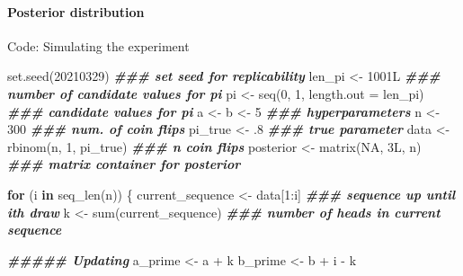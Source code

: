 \documentclass[
  11pt,
]{article}
\newenvironment{Shaded}{\begin{snugshade}}{\end{snugshade}}
\newcommand{\AttributeTok}[1]{\textcolor[rgb]{0.77,0.63,0.00}{#1}}
\newcommand{\ConstantTok}[1]{\textcolor[rgb]{0.00,0.00,0.00}{#1}}
\newcommand{\ControlFlowTok}[1]{\textcolor[rgb]{0.13,0.29,0.53}{\textbf{#1}}}
\newcommand{\DecValTok}[1]{\textcolor[rgb]{0.00,0.00,0.81}{#1}}
\newcommand{\DocumentationTok}[1]{\textcolor[rgb]{0.56,0.35,0.01}{\textbf{\textit{#1}}}}
\newcommand{\FunctionTok}[1]{\textcolor[rgb]{0.00,0.00,0.00}{#1}}
\newcommand{\NormalTok}[1]{#1}
\newcommand{\OtherTok}[1]{\textcolor[rgb]{0.56,0.35,0.01}{#1}}
\newcommand{\SpecialCharTok}[1]{\textcolor[rgb]{0.00,0.00,0.00}{#1}}
\begin{document}
\hypertarget{posterior-distribution-1}{%
\paragraph{Posterior distribution}\label{posterior-distribution-1}}

Code: Simulating the experiment

\begin{Shaded}
\begin{Highlighting}[]
\FunctionTok{set.seed}\NormalTok{(}\DecValTok{20210329}\NormalTok{)                   }\DocumentationTok{\#\#\# set seed for replicability}
\NormalTok{len\_pi }\OtherTok{\textless{}{-}}\NormalTok{ 1001L                      }\DocumentationTok{\#\#\# number of candidate values for pi}
\NormalTok{pi }\OtherTok{\textless{}{-}} \FunctionTok{seq}\NormalTok{(}\DecValTok{0}\NormalTok{, }\DecValTok{1}\NormalTok{, }\AttributeTok{length.out =}\NormalTok{ len\_pi) }\DocumentationTok{\#\#\# candidate values for pi}
\NormalTok{a }\OtherTok{\textless{}{-}}\NormalTok{ b }\OtherTok{\textless{}{-}} \DecValTok{5}                          \DocumentationTok{\#\#\# hyperparameters}
\NormalTok{n }\OtherTok{\textless{}{-}} \DecValTok{300}                             \DocumentationTok{\#\#\# num. of coin flips}
\NormalTok{pi\_true }\OtherTok{\textless{}{-}}\NormalTok{ .}\DecValTok{8}                        \DocumentationTok{\#\#\# true parameter}
\NormalTok{data }\OtherTok{\textless{}{-}} \FunctionTok{rbinom}\NormalTok{(n, }\DecValTok{1}\NormalTok{, pi\_true)        }\DocumentationTok{\#\#\# n coin flips}
\NormalTok{posterior }\OtherTok{\textless{}{-}} \FunctionTok{matrix}\NormalTok{(}\ConstantTok{NA}\NormalTok{, 3L, n)       }\DocumentationTok{\#\#\# matrix container for posterior}

\ControlFlowTok{for}\NormalTok{ (i }\ControlFlowTok{in} \FunctionTok{seq\_len}\NormalTok{(n)) \{    }
\NormalTok{  current\_sequence }\OtherTok{\textless{}{-}}\NormalTok{ data[}\DecValTok{1}\SpecialCharTok{:}\NormalTok{i]      }\DocumentationTok{\#\#\# sequence up until ith draw}
\NormalTok{  k }\OtherTok{\textless{}{-}} \FunctionTok{sum}\NormalTok{(current\_sequence)         }\DocumentationTok{\#\#\# number of heads in current sequence}
  
  \DocumentationTok{\#\#\#\#\# Updating}
\NormalTok{  a\_prime }\OtherTok{\textless{}{-}}\NormalTok{ a }\SpecialCharTok{+}\NormalTok{ k               }
\NormalTok{  b\_prime }\OtherTok{\textless{}{-}}\NormalTok{ b }\SpecialCharTok{+}\NormalTok{ i }\SpecialCharTok{{-}}\NormalTok{ k}
  

\end{Highlighting}
\end{Shaded}
\end{document}
